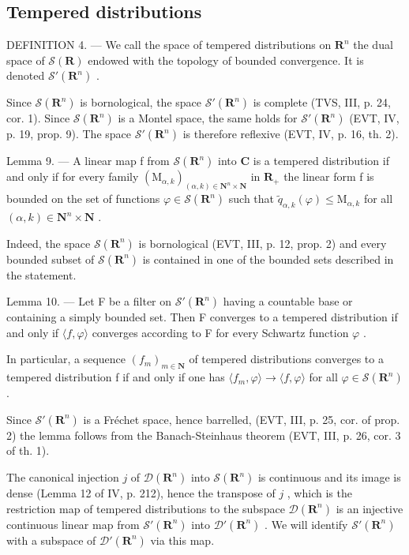 \subsection{Tempered distributions}

DEFINITION 4. --- We call the space of tempered distributions on \(\mathbf{R}^{n}\) the dual space of \(\mathcal{S}(\mathbf{R})\) endowed with the topology of bounded convergence. It is denoted \(\mathcal{S}'(\mathbf{R}^{n})\) .

Since \(\mathcal{S}(\mathbf{R}^n)\) is bornological, the space \(\mathcal{S}'(\mathbf{R}^n)\) is complete (TVS, III, p. 24, cor. 1). Since \(\mathcal{S}(\mathbf{R}^n)\) is a Montel space, the same holds for \(\mathcal{S}'(\mathbf{R}^n)\) (EVT, IV, p. 19, prop. 9). The space \(\mathcal{S}'(\mathbf{R}^n)\) is therefore reflexive (EVT, IV, p. 16, th. 2).

Lemma 9. --- A linear map f from \(\mathcal{S}(\mathbf{R}^{n})\) into \(\mathbf{C}\) is a tempered distribution if and only if for every family \((\mathrm{M}_{\alpha,k})_{(\alpha,k)\in\mathbf{N}^{n}\times\mathbf{N}}\) in \(\mathbf{R}_{+}\) the linear form f is bounded on the set of functions \(\varphi\in\mathcal{S}(\mathbf{R}^{n})\) such that \(\widetilde{q}_{\alpha,k}(\varphi)\leqslant\mathrm{M}_{\alpha,k}\) for all \((\alpha,k)\in\mathbf{N}^{n}\times\mathbf{N}\) .

Indeed, the space \(\mathcal{S}(\mathbf{R}^{n})\) is bornological (EVT, III, p. 12, prop. 2) and every bounded subset of \(\mathcal{S}(\mathbf{R}^{n})\) is contained in one of the bounded sets described in the statement.

Lemma 10. --- Let F be a filter on \(\mathcal{S}'(\mathbf{R}^n)\) having a countable base or containing a simply bounded set. Then F converges to a tempered distribution if and only if \(\langle f, \varphi \rangle\) converges according to F for every Schwartz function \(\varphi\) .

In particular, a sequence \((f_{m})_{m\in\mathbf{N}}\) of tempered distributions converges to a tempered distribution f if and only if one has \(\langle f_{m},\varphi\rangle\to\langle f,\varphi\rangle\) for all \(\varphi\in\mathcal{S}(\mathbf{R}^{n})\) .

Since \(\mathcal{S}'(\mathbf{R}^n)\) is a Fréchet space, hence barrelled, (EVT, III, p. 25, cor. of prop. 2) the lemma follows from the Banach-Steinhaus theorem (EVT, III, p. 26, cor. 3 of th. 1).

The canonical injection \(j\) of \(\mathcal{D}(\mathbf{R}^{n})\) into \(\mathcal{S}(\mathbf{R}^{n})\) is continuous and its image is dense (Lemma 12 of IV, p. 212), hence the transpose of \(j\) , which is the restriction map of tempered distributions to the subspace \(\mathcal{D}(\mathbf{R}^{n})\) is an injective continuous linear map from \(\mathcal{S}'(\mathbf{R}^{n})\) into \(\mathcal{D}'(\mathbf{R}^{n})\) . We will identify \(\mathcal{S}'(\mathbf{R}^{n})\) with a subspace of \(\mathcal{D}'(\mathbf{R}^{n})\) via this map.

